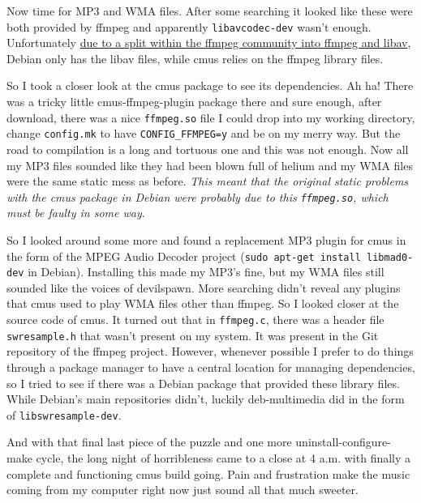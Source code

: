 \documentclass[12pt]{article}
\begin{document}
Now time for MP3 and WMA files.
After some searching it looked like these were both provided by ffmpeg and apparently \lstinline$libavcodec-dev$ wasn't enough.
Unfortunately \href{http://blog.pkh.me/p/13-the-ffmpeg-libav-situation.html}{due to a split within the ffmpeg community into ffmpeg and libav}, Debian only has the libav files, while cmus relies on the ffmpeg library files.

So I took a closer look at the cmus package to see its dependencies.
Ah ha!
There was a tricky little cmus-ffmpeg-plugin package there and sure enough, after download, there was a nice \lstinline$ffmpeg.so$ file I could drop into my working directory, change \lstinline$config.mk$ to have \lstinline$CONFIG_FFMPEG=y$ and be on my merry way.
But the road to compilation is a long and tortuous one and this was not enough.
Now all my MP3 files sounded like they had been blown full of helium and my WMA files were the same static mess as before.
\emph{This meant that the original static problems with the cmus package in Debian were probably due to this \lstinline$ffmpeg.so$, which must be faulty in some way}.

So I looked around some more and found a replacement MP3 plugin for cmus in the form of the MPEG Audio Decoder project (\lstinline$sudo apt-get install libmad0-dev$ in Debian).
Installing this made my MP3's fine, but my WMA files still sounded like the voices of devilspawn.
More searching didn't reveal any plugins that cmus used to play WMA files other than ffmpeg.
So I looked closer at the source code of cmus.
It turned out that in \lstinline$ffmpeg.c$, there was a header file \lstinline$swresample.h$ that wasn't present on my system.
It was present in the Git repository of the ffmpeg project.
However, whenever possible I prefer to do things through a package manager to have a central location for managing dependencies, so I tried to see if there was a Debian package that provided these library files.
While Debian's main repositories didn't, luckily deb-multimedia did in the form of \lstinline$libswresample-dev$.

And with that final last piece of the puzzle and one more uninstall-configure-make cycle, the long night of horribleness came to a close at 4 a.m. with finally a complete and functioning cmus build going.
Pain and frustration make the music coming from my computer right now just sound all that much sweeter.
\end{document}
